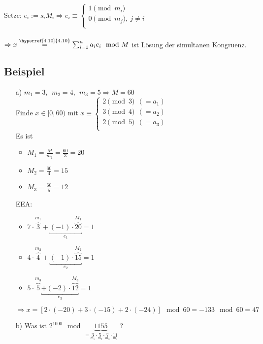 \documentclass[a4paper, 12pt,titlepage, pdf, headsepline]{article}
\renewcommand{\>}{\rightarrow}
\renewcommand{\*}{\cdot}
\begin{document}
	      Setze: $e_i := s_i M_i \Rightarrow e_i \equiv \begin{cases*}
	      1 \pmod{m_i} \\
	      0 \pmod{m_j},~ j \neq i\\
	\end{cases*}$ \\
	\\
	$\Rightarrow x \overset{\textrm{\hyperref[4.10]{4.10}}}{=} \sum_{i = 1}^{n}a_i e_i \mod{M} $ ist Lösung der simultanen Kongruenz.
	\subsection{Beispiel}
	\begin{itemize}
		\item[a)] $m_1 = 3, ~~m_2 = 4, ~~m_3 = 5 \Rightarrow M = 60$\\
		      Finde $x \in [0,60)$ mit $x \equiv \begin{cases*}
		      	2 \pmod 3~~(=a_1)\\
		      	3 \pmod 4~~(=a_2)\\
		      	2 \pmod 5~~(=a_3)\\
		      	\end{cases*}$ \\
		      	Es ist 
		      	\begin{itemize}
		      		\item $M_1 = \frac{M}{m_1} = \frac{60}{3} = 20$ 
		      		\item  $M_2 = \frac{60}{4} = 15$
		      		\item $M_3 = \frac{60}{5} = 12$ 
		      	\end{itemize}
		      	EEA: 
		      	\begin{itemize}
		      		\item $7 \cdot \overbrace{3}^{m_1} + \underbracket{(-1) \cdot \overbrace{20}^{M_1}}_{e_1} = 1$
		      		\item $4 \cdot \overbrace{4}^{m_2} + \underbracket{(-1) \cdot \overbrace{15}^{M_2}}_{e_2} = 1$
		      		\item $5 \cdot \overbrace{5}^{m_3} \underbracket{+ (-2) \cdot \overbrace{12}^{M_3}}_{e_3} = 1$
		      	\end{itemize}
		      	$\Rightarrow x = [2 \cdot (-20) + 3 \cdot (-15) + 2 \cdot (-24)] \mod 60  =-133\mod 60= 47$
		      	\item[b)] Was ist $2^{1000} \mod \underbrace{1155}_{=\underset{m_1}{3} \cdot \underset{m_2}{5} \cdot \underset{m_3}{7} \cdot \underset{m_4}{11}}$ ?
		      	\begin{itemize}

\end{itemize}
\end{itemize}
\end{document}

